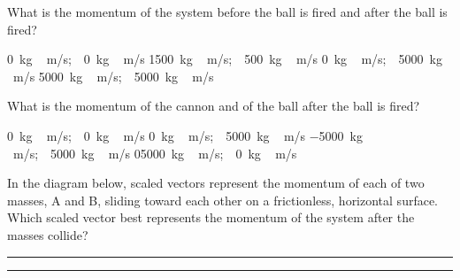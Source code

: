 \documentclass[answers]{exam}
\begin{document}
\begin{questions}
\question
What is the momentum of the system before the ball is fired and after the ball is fired?

\begin{randomizechoices}[norandomize]
    \correctchoice \SI{0}{kg\,m/s};\ \  \SI{0}{kg\,m/s}
    \choice \SI{1500}{kg\,m/s};\ \  \SI{500}{kg\,m/s}
    \choice \SI{0}{kg\,m/s};\ \  \SI{5000}{kg\,m/s}
    \choice \SI{5000}{kg\,m/s};\ \  \SI{5000}{kg\,m/s}
\end{randomizechoices}

\question 
What is the momentum of the cannon and of the ball after the ball is fired?

\begin{randomizechoices}[norandomize]
    \choice \SI{0}{kg\,m/s};\ \  \SI{0}{kg\,m/s}
    \choice \SI{0}{kg\,m/s};\ \  \SI{5000}{kg\,m/s}
    \correctchoice \SI{-5000}{kg\,m/s};\ \  \SI{5000}{kg\,m/s}
    \choice \SI{05000}{kg\,m/s};\ \  \SI{0}{kg\,m/s}
\end{randomizechoices}


\question
In the diagram below, scaled vectors represent the momentum of each of two masses, A and B, sliding toward each other on a frictionless, horizontal surface. Which scaled vector best represents the momentum of the system after the masses collide?

\begin{center}
\end{center}

\begin{randomizeoneparchoices}[norandomize]
    \choice {}
    \correctchoice {}
    \choice {}
    \choice {}
\end{randomizeoneparchoices}

\bigskip

\hrule
\hrule



\clearpage
\printkeytable

\end{questions}
\end{document}
